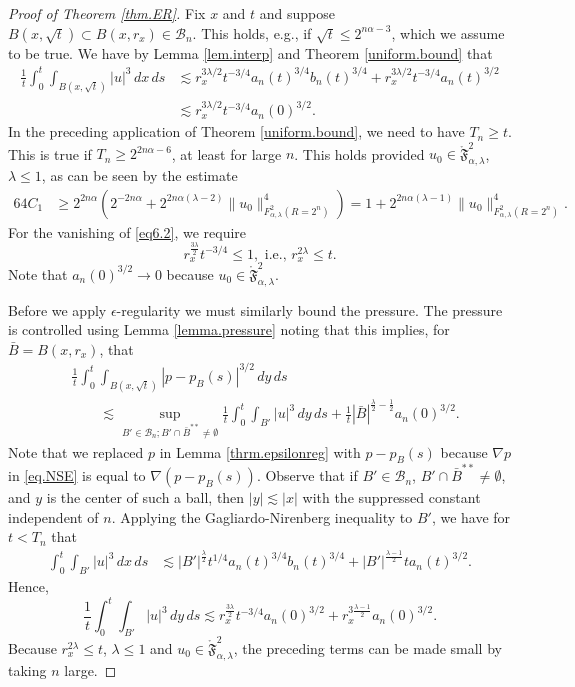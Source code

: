 \documentclass[11pt]{article}
\numberwithin{equation}{section}
\theoremstyle{remark}
\theoremstyle{definition}
\newcommand{\nb}{\nabla}
\newcommand\al{\alpha}
\newcommand\la{\lambda}
\newcommand{\EQS}[1]{\begin{equation}\begin{split} #1 \end{split}\end{equation}}
\newcommand{\EQN}[1]{\begin{equation*}\begin{split} #1 \end{split}\end{equation*}}
\begin{document}
\begin{proof}[Proof of Theorem \ref{thm.ER}] Fix $x$ and $t$ and suppose $B(x,\sqrt t) \subset B(x,r_x)\in \mathcal B_n$. This holds, e.g., if $\sqrt t \leq 2^{n\al-3}$, which we assume to be true.
We have by Lemma \ref{lem.interp}  and Theorem \ref{uniform.bound} that 
\EQS{\label{eq6.2}
\frac 1 {  t}\int_0^t \int_{B(x,\sqrt t)} |u|^3\,dx\,ds &\lesssim r_x^{3\la/2  }t^{-3/4}  a_n(t)^{ 3/4} b_n(t)^{ 3/4} +  r_x^{3\la /2}  t^{ -3/4 } a_n(t)^{3/2}
\\&\lesssim %
r_x^{3 \la /2}  t^{-3/4}  a_n(0)^{3/2}.
}
In the preceding application of Theorem \ref{uniform.bound}, we need to have  $T_n \geq t$.
This is true if $T_n\geq 2^{2n\al-6}$, at least for large $n$.
This holds provided $u_0\in \mathring{\mathfrak F}^{2}_{\al,\la}$, $\la\leq 1$, as can be seen by the estimate%
%
%
%
%
%
\EQN{
64  C_1 &\geq 2^{2n\al }(2^{-2n\al} + 2^{2n\al (\la-2)} \|u_0\|_{F^2_{\al,\la}({R=2^n})}^4)
=1+ 2^{2n\al (\la-1)}  \|u_0\|_{F^2_{\al,\la}({R=2^n})}^4.
}
For the vanishing of \eqref{eq6.2}, we require
\[
r_x^{\frac {3 \la} 2 }t^{-3/4}  \leq 1, \mbox{ i.e.,  }r_x^{2\la}\leq t.
\]
Note that $a_n(0)^{3/2}\to 0$ because $u_0\in \mathring{ \mathfrak F}^{2}_{\al,\la}$.  

Before we apply $\epsilon$-regularity we must similarly bound the pressure.
The pressure is controlled using Lemma \ref{lemma.pressure} noting that this implies, for $\bar B = B(x,r_x)$, that
\EQN{
&\frac 1 { t }\int_0^{t}\int_{B(x,\sqrt t)} |p -p_B(s)|^{3/2}\,dy\,ds \\&\qquad \lesssim \sup_{B'\in \mathcal B_n; B'\cap \bar B^{**}\neq \emptyset} \frac {1}{t}\int_0^{t} \int_{B'} |u|^3\,dy\,ds
 +\frac 1 t  |\bar B|^{\frac \la 2-\frac 1 2}  a_n(0)^{3/2}.
}
Note that we  replaced $p$ in Lemma \ref{thrm.epsilonreg}   with $p-p_B(s)$ because $\nb p$ in \eqref{eq.NSE} is equal to $\nb (p-p_B(s))$.
Observe that if $B'\in \mathcal B_n$, $B'\cap \bar B^{**}\neq \emptyset$, and $y$ is the center of such a ball,  then $|y|\lesssim |x|$ with the suppressed constant independent of $n$.  
Applying the Gagliardo-Nirenberg inequality to $B'$,    we have for $t<T_n$ that
\EQN{
 \int_0^t \int_{B'} |u|^3\,dx\,ds &\lesssim |B'|^{\frac \la 2 }t^{1/4} a_n(t)^{3/4}b_n(t)^{3/4} + |B'|^{\frac {\la-1} 2} t a_n(t) ^{3/2}.
}
Hence,
%
%
%
%
%
%
%
%
%
%
%
%
%
%
%
%
%
%
%
%
%
%
%
%
%
%
\[
 \frac {1}{t}\int_0^{t} \int_{B'} |u|^3\,dy\,ds \lesssim r_x^{\frac {3\la} 2 }t^{-3/4} a_n(0)^{3/2}+ r_x^{3\frac {\la-1} 2}  a_n(0) ^{3/2}.
\]
Because $r_x^{2\la}\leq t$, $\la\leq 1$ and $u_0\in \mathring {\mathfrak F}^{2}_{\al,\la}$, the preceding terms can be made small by taking $n$ large.


\end{proof}
\end{document}
